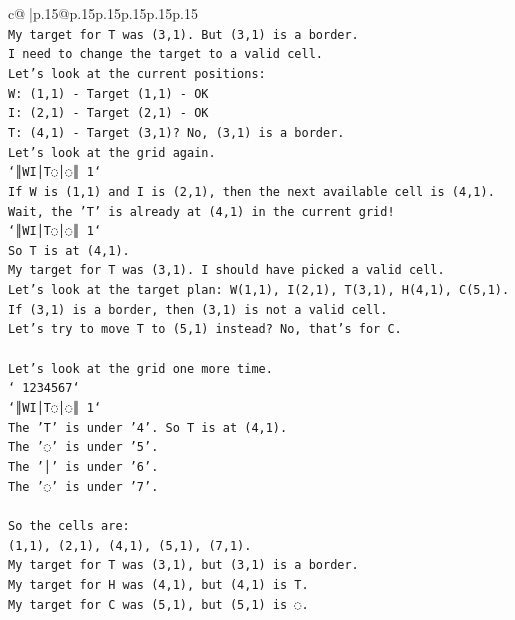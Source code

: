 \documentclass{article}
\begin{document}
{\begin{supertabular}{c@{$\;$}|p{.15\linewidth}@{}p{.15\linewidth}p{.15\linewidth}p{.15\linewidth}p{.15\linewidth}p{.15\linewidth}}
{{{\\ 
\texttt{My target for T was (3,1). But (3,1) is a border.} \\
\texttt{I need to change the target to a valid cell.} \\
\texttt{Let's look at the current positions:} \\
\texttt{W: (1,1) {-} Target (1,1) {-} OK} \\
\texttt{I: (2,1) {-} Target (2,1) {-} OK} \\
\texttt{T: (4,1) {-} Target (3,1)? No, (3,1) is a border.} \\
\texttt{Let's look at the grid again.} \\
\texttt{`║WI│T◌│◌║ 1`} \\
\texttt{If W is (1,1) and I is (2,1), then the next available cell is (4,1).} \\
\texttt{Wait, the 'T' is already at (4,1) in the current grid!} \\
\texttt{`║WI│T◌│◌║ 1`} \\
\texttt{So T is at (4,1).} \\
\texttt{My target for T was (3,1). I should have picked a valid cell.} \\
\texttt{Let's look at the target plan: W(1,1), I(2,1), T(3,1), H(4,1), C(5,1).} \\
\texttt{If (3,1) is a border, then (3,1) is not a valid cell.} \\
\texttt{Let's try to move T to (5,1) instead? No, that's for C.} \\
\\ 
\texttt{Let's look at the grid one more time.} \\
\texttt{` 1234567`} \\
\texttt{`║WI│T◌│◌║ 1`} \\
\texttt{The 'T' is under '4'. So T is at (4,1).} \\
\texttt{The '◌' is under '5'.} \\
\texttt{The '│' is under '6'.} \\
\texttt{The '◌' is under '7'.} \\
\\ 
\texttt{So the cells are:} \\
\texttt{(1,1), (2,1), (4,1), (5,1), (7,1).} \\
\texttt{My target for T was (3,1), but (3,1) is a border.} \\
\texttt{My target for H was (4,1), but (4,1) is T.} \\
\texttt{My target for C was (5,1), but (5,1) is ◌.} \\
}}}
\end{supertabular}}
\end{document}
